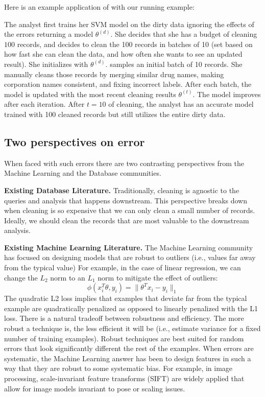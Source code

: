 \iffalse
Here is an example application of \sys with our running example:
\begin{example}
The analyst first trains her SVM model on the dirty data ignoring the effects of the errors returning a model $\theta^{(d)}$.
She decides that she has a budget of cleaning $100$ records, and decides to clean the 100 records in batches of 10 (set based on how fast she can clean the data, and how often she wants to see an updated result).
She initializes \sys with $\theta^{(d)}$.
\sys samples an initial batch of 10 records.
She manually cleans those records by merging similar drug names, making corporation names consistent, and fixing incorrect labels.
After each batch, the model is updated with the most recent cleaning results $\theta^{(t)}$.
The model improves after each iteration.
After $t=10$ of cleaning, the analyst has an accurate model trained with 100 cleaned records but still utilizes the entire dirty data.
\end{example}



\subsection{Two perspectives on error}
When faced with such errors there are two contrasting perspectives from the Machine Learning and the Database communities.

\vspace{0.5em}

\noindent\textbf{Existing Database Literature. } 
Traditionally, cleaning is agnostic to the queries and analysis that happens downstream. 
This perspective breaks down when cleaning is so expensive that we can only clean a small number of records.
Ideally, we should clean the records that are most valuable to the downstream analysis.

\vspace{0.5em}

\noindent\textbf{Existing  Machine Learning Literature. } The Machine Learning community has focused on
designing models that are robust to outliers (i.e., values far away from the typical value)
For example, in the case of linear regression, we can change the $L_2$ norm to an $L_1$ norm to mitigate the effect of outliers:
\[
\phi(x_{i}^T\theta,y_{i}) = \|\theta^Tx_{i} - y_i \|_1
\]
The quadratic L2 loss implies that examples that deviate far from the typical example are quadratically penalized as opposed to linearly penalized with the L1 loss.
There is a natural tradeoff between robustness and efficiency.
The more robust a technique is, the less efficient it will be (i.e., estimate variance for a fixed number of training examples).
Robust techniques are best suited for random errors that look significantly different the rest of the examples.
When errors are systematic, the Machine Learning answer has been to design features in such a way that they are robust to some systematic bias.
For example, in image processing, scale-invariant feature transforms (SIFT) are widely applied that allow for image models invariant to pose or scaling issues.


